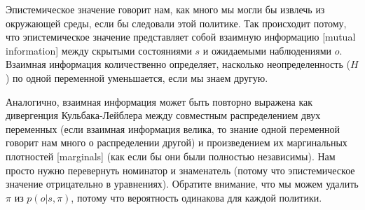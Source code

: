 \documentclass[twoside,leqno, 11pt]{article}
\begin{document}
	
	Эпистемическое значение говорит нам, как много мы могли бы извлечь из окружающей среды, если бы следовали этой политике. Так происходит потому, что эпистемическое значение представляет собой взаимную информацию [mutual information] между скрытыми состояниями $s$ и ожидаемыми наблюдениями $o$. Взаимная информация количественно определяет, насколько неопределенность ($H$) по одной переменной уменьшается, если мы знаем другую.
	
	
	\begin{figure}[h]
	\end{figure}
	
	Аналогично, взаимная информация может быть повторно выражена как дивергенция Кульбака-Лейблера между совместным распределением двух переменных (если взаимная информация велика, то знание одной переменной говорит нам много о распределении другой) и произведением их маргинальных плотностей [marginals] (как если бы они были полностью независимы). Нам просто нужно перевернуть номинатор и знаменатель (потому что эпистемическое значение отрицательно в уравнениях). Обратите внимание, что мы можем удалить $\pi$ из $p(o|s,\pi)$, потому что вероятность одинакова для каждой политики.
	
	
\end{document}
